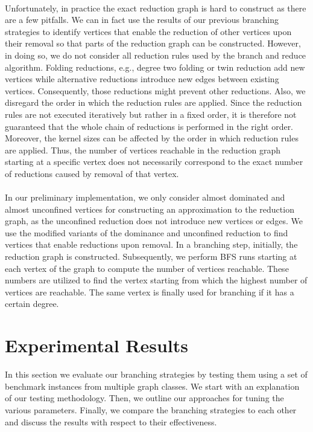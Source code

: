 \documentclass[12pt,a4paper,twoside]{scrartcl}
\numberwithin{equation}{section}
\begin{document}
\paragraph{}
Unfortunately, in practice the exact reduction graph is hard to construct as there are a few pitfalls. We can in fact use the results of our previous branching strategies to identify vertices that enable the reduction of other vertices upon their removal so that parts of the reduction graph can be constructed. However, in doing so, we do not consider all reduction rules used by the branch and reduce algorithm. Folding reductions, e.g., degree two folding or twin reduction add new vertices while alternative reductions introduce new edges between existing vertices. Consequently, those reductions might prevent other reductions. Also, we disregard the order in which the reduction rules are applied. Since the reduction rules are not executed iteratively but rather in a fixed order, it is therefore not guaranteed that the whole chain of reductions is performed in the right order. Moreover, the kernel sizes can be affected by the order in which reduction rules are applied. Thus, the number of vertices reachable in the reduction graph starting at a specific vertex does not necessarily correspond to the exact number of reductions caused by removal of that vertex.

\paragraph{}
In our preliminary implementation, we only consider almost dominated and almost unconfined vertices for constructing an approximation to the reduction graph, as the unconfined reduction does not introduce new vertices or edges. We use the modified variants of the dominance and unconfined reduction to find vertices that enable reductions upon removal. In a branching step, initially, the reduction graph is constructed. Subsequently, we perform BFS runs starting at each vertex of the graph to compute the number of vertices reachable. These numbers are utilized to find the vertex starting from which the highest number of vertices are reachable. The same vertex is finally used for branching if it has a certain degree.

\clearpage

\section{Experimental Results} \label{sec5}
In this section we evaluate our branching strategies by testing them using a set of benchmark instances from multiple graph classes. We start with an explanation of  our testing methodology. Then, we outline our approaches for tuning the various parameters. Finally, we compare the branching strategies to each other and discuss the results with respect to their effectiveness.
\end{document}
